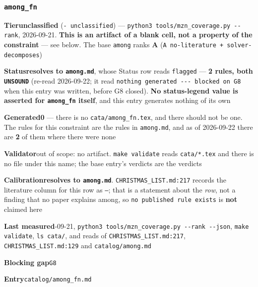 \documentclass[10pt,a4paper]{article}
\newcommand{\entryfield}[2]{{\raggedright\textbf{#1}\quad #2\par}}
\begin{document}
\subsubsection*{\texttt{among\_\allowbreak{}fn}}
\label{entry:among-fn}
\entryfield{Tier}{\textbf{unclassified} (\texttt{- unclassified}) --- \texttt{python3 tools/\allowbreak{}mzn\_\allowbreak{}coverage.\allowbreak{}py -\allowbreak{}-\allowbreak{}rank}, 2026-09-21. \textbf{This is an artifact of a blank cell, not a property of the constraint} --- see below. The base \texttt{among} ranks \textbf{A} (\texttt{A no-\allowbreak{}literature + solver-\allowbreak{}decomposes})}
\entryfield{Status}{\textbf{resolves to \texttt{among.md}}, whose Status row reads \texttt{flagged} --- \textbf{2 rules, both \texttt{UNSOUND}} (re-read 2026-09-22; it read \texttt{nothing generated -\allowbreak{}-\allowbreak{}-\allowbreak{} blocked on G8} when this entry was written, before G8 closed). \textbf{No status-legend value is asserted for \texttt{among\_fn} itself}, and this entry generates nothing of its own}
\entryfield{Generated}{\textbf{0} --- there is no \texttt{cata/among\_fn.tex}, and there should not be one. The rules for this constraint are the rules in \texttt{among.md}, and as of 2026-09-22 there are \textbf{2} of them where there were none}
\entryfield{Validator}{out of scope: no artifact. \texttt{make validate} reads \texttt{cata/*.tex} and there is no file under this name; the base entry's verdicts are the verdicts}
\entryfield{Calibration}{\textbf{resolves to \texttt{among.md}}. \texttt{CHRISTMAS\_LIST.md:217} records the literature column for this row as \texttt{---}; that is a statement about the \emph{row}, not a finding that no paper explains among, so \texttt{no published rule exists} is \textbf{not} claimed here}
\entryfield{Last measured}{2026-09-21, \texttt{python3 tools/\allowbreak{}mzn\_\allowbreak{}coverage.\allowbreak{}py -\allowbreak{}-\allowbreak{}rank -\allowbreak{}-\allowbreak{}json}, \texttt{make validate}, \texttt{ls cata/}, and reads of \texttt{CHRISTMAS\_LIST.md:217}, \texttt{CHRISTMAS\_LIST.md:129} and \texttt{catalog/among.md}}
\entryfield{Blocking gap}{\texttt{G8}}
\entryfield{Entry}{\texttt{catalog/among\_fn.md}}
\end{document}
